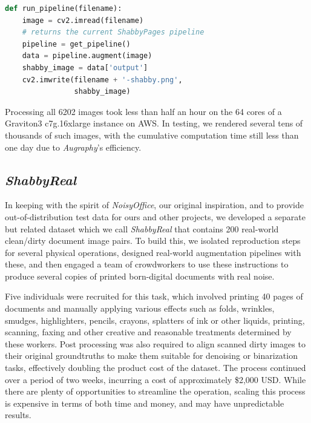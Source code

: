\documentclass[runningheads]{llncs}
\begin{document}
\begin{lstlisting}[language=Python]
  def run_pipeline(filename):
    image = cv2.imread(filename)
    # returns the current ShabbyPages pipeline
    pipeline = get_pipeline()
    data = pipeline.augment(image)
    shabby_image = data['output']
    cv2.imwrite(filename + '-shabby.png',
                shabby_image)
\end{lstlisting}

Processing all 6202 images took less than half an hour on the 64 cores of a Graviton3 c7g.16xlarge instance on AWS. In testing, we rendered several tens of thousands of such images, with the cumulative computation time still less than one day due to \emph{Augraphy}'s efficiency.

\subsection{\emph{ShabbyReal}}
In keeping with the spirit of \emph{NoisyOffice}, our original inspiration, and to provide out-of-distribution test data for ours and other projects, we developed a separate but related dataset which we call \emph{ShabbyReal} that contains 200 real-world clean/dirty document image pairs. To build this, we isolated reproduction steps for several physical operations, designed real-world augmentation pipelines with these, and then engaged a team of crowdworkers to use these instructions to produce several copies of printed born-digital documents with real noise.

Five individuals were recruited for this task, which involved printing 40 pages of documents and manually applying various effects such as folds, wrinkles, smudges, highlighters, pencils, crayons, splatters of ink or other liquids, printing, scanning, faxing and other creative and reasonable treatments determined by these workers.  Post processing was also required to align scanned dirty images to their original groundtruths to make them suitable for denoising or binarization tasks, effectively doubling the product cost of the dataset. 
The process continued over a period of two weeks, incurring a cost of approximately \$2,000 USD.
While there are plenty of opportunities to streamline the operation, scaling this process is expensive in terms of both time and money, and may have unpredictable results.
\end{document}
